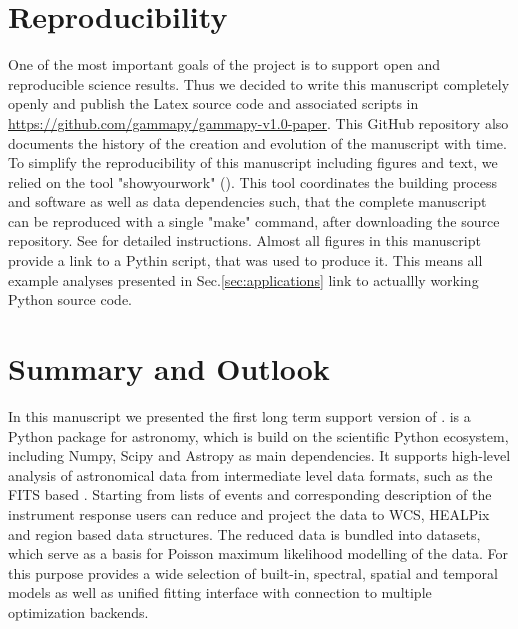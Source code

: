 \section{Reproducibility}
\label{sec:reproducibility}
One of the most important goals of the \gammapy project is to support open and
reproducible science results. Thus we decided to write this manuscript
completely openly and publish the Latex source code and associated
scripts in \url{https://github.com/gammapy/gammapy-v1.0-paper}.
This GitHub repository also documents the history of the creation
and evolution of the manuscript with time. To simplify the reproducibility
of this manuscript including figures and text, we relied on the tool
"showyourwork" (). This tool coordinates the building
process and software as well as data dependencies such, that the complete
manuscript can be reproduced with a single "make" command, after
downloading the source repository. See  for detailed
instructions. Almost all figures in this manuscript provide a link
to a Pythin script, that was used to produce it. This means all
example analyses presented in Sec.\ref{sec:applications} link to
actuallly working Python source code.


\section{Summary and Outlook}
\label{sec:summary-and-outlook}

In this manuscript we presented the first long term support  version of \gammapy.
\gammapy is a Python package for \gammaray astronomy, which is build on the
scientific Python ecosystem, including Numpy, Scipy and Astropy as
main dependencies. It supports high-level analysis of astronomical \gammaray
data from intermediate level data formats, such as the FITS based
\gadf. Starting from lists of \gammaray events and corresponding description
of the instrument response users can reduce and project the data
to WCS, HEALPix and region based data structures. The reduced data is bundled
into datasets, which serve as a basis for Poisson maximum likelihood
modelling of the data. For this purpose \gammapy provides a wide selection
of built-in, spectral, spatial and temporal models as well as unified
fitting interface with connection to multiple optimization backends.

